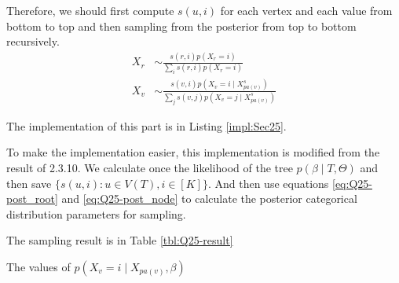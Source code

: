 \documentclass[12pt]{article}
\newenvironment{problem}[2][Problem]{\begin{trivlist}
\item[\hskip \labelsep {\bfseries #1}\hskip \labelsep {\bfseries #2.}]}{\end{trivlist}}
\begin{document}
\begin{problem}{2.5.15}
Therefore, we should first compute $s(u, i)$ for each vertex and each value 
from bottom to top and then sampling from the posterior from top to bottom
recursively.
\begin{align}
    X_r &\sim \frac{s(r,i)p(X_r =i)}{\sum_{i}s(r,i)p(X_r =i)} \label{eq:Q25-post_root} \\ 
    X_v &\sim \frac{s(v,i)p(X_v = i\mid X_{pa(v)}^{s})}
                {\sum_{j}s(v,j)p(X_v = j\mid X_{pa(v)}^{s})} \label{eq:Q25-post_node}
\end{align}
\end{problem}

\begin{problem}{2.5.16}
The implementation of this part is in Listing \ref{impl:Sec25}.

To make the implementation easier, this implementation is modified from the result
of 2.3.10. We calculate once the likelihood of the tree $p(\beta \mid T, \Theta)$ and
then save $\{s(u, i) : u \in V(T), i \in [K]\}$. And then use equations 
\eqref{eq:Q25-post_root} and \eqref{eq:Q25-post_node} to calculate the posterior
categorical distribution parameters for sampling.
\end{problem}

\begin{problem}{2.5.17}
The sampling result is in Table \ref{tbl:Q25-result}

\begin{table}
    \centering
    \caption{The values of $p(X_v = i\mid X_{pa(v)}, \beta)$}\label{tbl:Q25-result}
\end{table} 
\end{problem}
\end{document}
